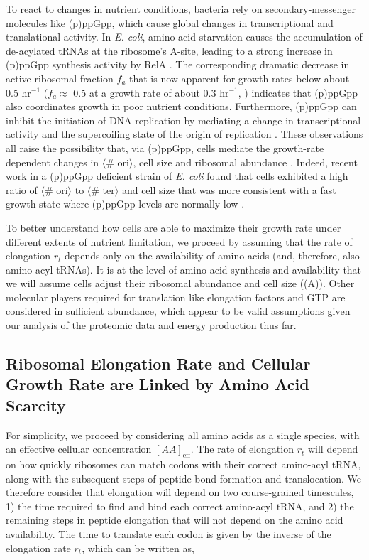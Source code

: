 To react to changes in nutrient conditions, bacteria rely on
secondary-messenger molecules like (p)ppGpp, which cause global changes in
transcriptional and translational activity. In \textit{E. coli}, amino acid
starvation causes the accumulation of de-acylated tRNAs at the ribosome's
A-site, leading to a strong increase in (p)ppGpp synthesis activity by RelA
\citep{hauryliuk2015}. The corresponding dramatic decrease in active
ribosomal fraction $f_a$ that is now apparent for growth rates below about
0.5 hr$^{-1}$ ($f_a \approx$ 0.5 at a growth rate of about 0.3 hr$^{-1}$,
\cite{dai2016}) indicates that (p)ppGpp also coordinates growth in poor
nutrient conditions. Furthermore, (p)ppGpp can inhibit the initiation of DNA
replication by mediating a change in transcriptional activity and the
supercoiling state of the origin of replication \citep{kraemer2019}. These
observations all raise the possibility that, via (p)ppGpp, cells mediate the
growth-rate dependent changes in $\langle$\# ori$\rangle$, cell size and
ribosomal abundance \citep{zhu2019, Buke2020}. Indeed, recent work in a
(p)ppGpp deficient strain of \textit{E. coli} found that cells exhibited a
high ratio of $\langle$\# ori$\rangle$ to $\langle$\# ter$\rangle$ and cell
size that was more consistent with a fast growth state where (p)ppGpp levels
are normally low \citep{fernandezcoll2020}.

To better understand how cells are able to maximize their growth rate under
different extents of nutrient limitation, we proceed by assuming that the
rate of elongation $r_t$ depends only on the availability of amino acids
(and, therefore, also amino-acyl tRNAs). It is at the level of amino acid
synthesis and availability that we will assume cells adjust their ribosomal
abundance and cell size ((A)). Other molecular players
required for translation like elongation factors and GTP are considered in
sufficient abundance, which appear to be valid assumptions given our analysis
of the proteomic data and energy production thus far.



\subsection{Ribosomal Elongation Rate and Cellular Growth Rate are Linked by Amino Acid Scarcity}
For simplicity, we proceed by considering all amino acids as a single species,
with an effective cellular
concentration $[AA]_{\text{eff}}$. The rate of elongation $r_t$ will depend on
how quickly ribosomes can match codons with their correct amino-acyl tRNA, along
with the subsequent steps of peptide bond formation and translocation. We therefore
consider that elongation will depend on two course-grained timescales, 1) the
time required to find and bind each correct amino-acyl tRNA, and 2) the remaining steps
in peptide elongation that will not depend on the amino acid availability. The
time to translate each codon is given by the inverse of the elongation rate
$r_t$, which can be written as,

